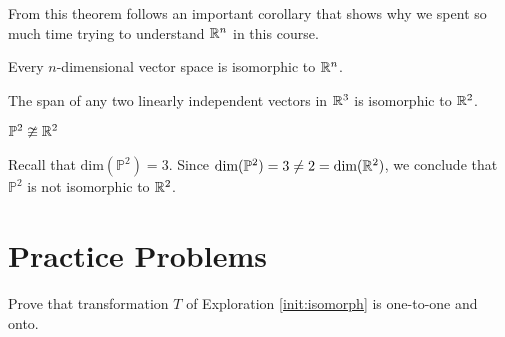 \documentclass{ximera}
\begin{document}
From this theorem follows an important corollary that shows why we spent so much time trying to understand $\mathbb{R}^n$ in this course.

\begin{corollary}\label{cor:ndimisotorn}
Every $n$-dimensional vector space is isomorphic to $\mathbb{R}^n$.
\end{corollary}

\begin{example}\label{ex:planeisoplane}
The span of any two linearly independent vectors in $\mathbb{R}^3$ is isomorphic to $\mathbb{R}^2$. \begin{center}
\quad\quad
{}
\end{center}

\end{example}

\begin{example}\label{ex:p2isor3b}
$\mathbb{P}^2\ncong \mathbb{R}^2$ 
\begin{explanation}
Recall that $\mbox{dim}(\mathbb{P}^2)=3$.  Since $\mbox{dim}(\mathbb{P}^2)=3\neq 2=\mbox{dim}(\mathbb{R}^2)$, we conclude that $\mathbb{P}^2$ is not isomorphic to $\mathbb{R}^2$.
\end{explanation}
\end{example}

\section*{Practice Problems}

\begin{problem}\label{prob:Tonetooneonto}
Prove that transformation $T$ of Exploration \ref{init:isomorph} is one-to-one and onto.
\end{problem}
\end{document}
